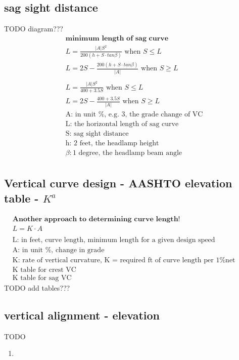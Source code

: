 \documentclass{article}
\begin{document}
  \subsection{sag sight distance}
  TODO diagram??? \\
  \begin{align*}
    & \textbf{minimum length of sag curve} \\
    & L = \frac{|A|S^2}{200(h + S \cdot tan \beta)}   \text{ when } S \leq L \\
    & L = 2S - \frac{200(h + S \cdot tan \beta)}{|A|} \text{ when } S \geq L \\
    \\
    & L = \frac{|A|S^2}{400 + 3.5S} \text{ when } S \leq L \\
    & L = 2S - \frac{400 + 3.5S}{|A|} \text{ when } S \geq L \\
    & \text{A: in unit \%, e.g. 3, the grade change of VC}\\
    & \text{L: the horizontal length of sag curve}\\
    & \text{S: sag sight distance} \\
    & \text{h: 2 feet, the headlamp height}\\
    & \beta: \text{1 degree, the headlamp beam angle}\\
  \end{align*}

  \subsection{Vertical curve design - AASHTO elevation table - $K^a$}
  \begin{align*}
    & \textbf{Another approach to determining curve length! }\\
    &  L = K \cdot A \\
    \\
    & \text{L: in feet, curve length, minimum length for a given design speed }\\
    & \text{A: in unit \%, change in grade  }\\
    & \text{K: rate of vertical curvature, K = required ft of curve length per 1\% net change in grade }\\
    & \text{K table for crest VC }\\
    & \text{K table for sag VC }
  \end{align*}
  TODO add tables???

  \subsection{vertical alignment - elevation}
  TODO %
  \begin{enumerate}
    \item 
  \end{enumerate}
  \begin{align*}
    \\
  \end{align*}
\end{document}
